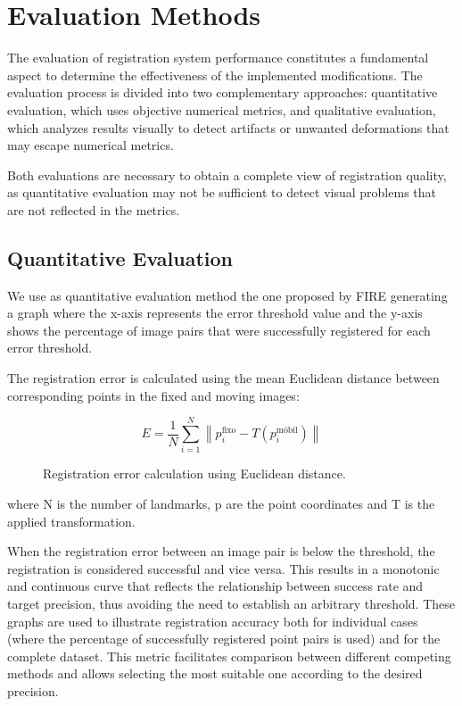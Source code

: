 \section{Evaluation Methods}
\label{sec:Métodos de Avaliación}

The evaluation of registration system performance constitutes a fundamental aspect to determine the effectiveness of the implemented modifications.
The evaluation process is divided into two complementary approaches: quantitative evaluation, which uses objective numerical metrics, and qualitative evaluation, which analyzes results visually to detect artifacts or unwanted deformations that may escape numerical metrics.

Both evaluations are necessary to obtain a complete view of registration quality, as quantitative evaluation may not be sufficient to detect visual problems that are not reflected in the metrics.

\subsection{Quantitative Evaluation}\label{subsec:Avaliación Cuantitativa}

We use as quantitative evaluation method the one proposed by FIRE \cite{FIRE}
generating a graph where the x-axis represents the error threshold value and the y-axis shows the percentage of image pairs that were successfully registered for each error threshold.

The registration error is calculated using the mean Euclidean distance between corresponding points in the fixed and moving images:

\begin{figure}[tbp]
    \centering
    \[
    E = \frac{1}{N} \sum_{i=1}^{N} \left\| p_i^{\text{fixo}} - T(p_i^{\text{móbil}}) \right\|
    \]
    \caption{Registration error calculation using Euclidean distance.}
    \label{fig:erro_registro}
\end{figure}

where N is the number of landmarks, p are the point coordinates and T is the applied transformation.

When the registration error between an image pair is below the threshold, the registration is considered successful and vice versa. This results in a monotonic and continuous curve that reflects the relationship between success rate and target precision, thus avoiding the need to establish an arbitrary threshold.
These graphs are used to illustrate registration accuracy both for individual cases (where the percentage of successfully registered point pairs is used)
and for the complete dataset.
This metric facilitates comparison between different competing methods and allows selecting the most suitable one according to the desired precision.

